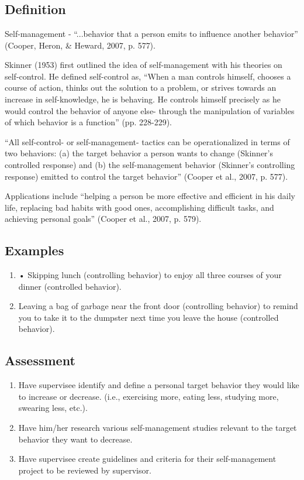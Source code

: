 \clearpage \section{\fourfOne{}}
\subsection{Definition}
Self-management - ``...behavior that a person emits to influence another behavior'' (Cooper, Heron, \& Heward, 2007, p. 577).

Skinner (1953) first outlined the idea of self-management with his theories on self-control. He defined self-control as, ``When a man controls himself, chooses a course of action, thinks out the solution to a problem, or strives towards an increase in self-knowledge, he is behaving. He controls himself precisely as he would control the behavior of anyone else- through the manipulation of variables of which behavior is a function'' (pp. 228-229).

``All self-control- or self-management- tactics can be operationalized in terms of two behaviors: (a) the target behavior a person wants to change (Skinner's controlled response) and (b) the self-management behavior (Skinner's controlling response) emitted to control the target behavior'' (Cooper et al., 2007, p. 577).

Applications include ``helping a person be more effective and efficient in his daily life, replacing bad habits with good ones, accomplishing difficult tasks, and achieving personal goals'' (Cooper et al., 2007, p. 579).
%
\subsection{Examples}
\begin{enumerate}
\item     • Skipping lunch (controlling behavior) to enjoy all three courses of your dinner (controlled behavior).
\item Leaving a bag of garbage near the front door (controlling behavior) to remind you to take it to the dumpster next time you leave the house (controlled behavior).
%
\end{enumerate}
%
\subsection{Assessment}
\begin{enumerate}
\item Have supervisee identify and define a personal target behavior they would like to increase or decrease. (i.e., exercising more, eating less, studying more, swearing less, etc.). 
\item Have him/her research various self-management studies relevant to the target behavior they want to decrease. 
\item Have supervisee create guidelines and criteria for their self-management project to be reviewed by supervisor. 
\end{enumerate}
%

